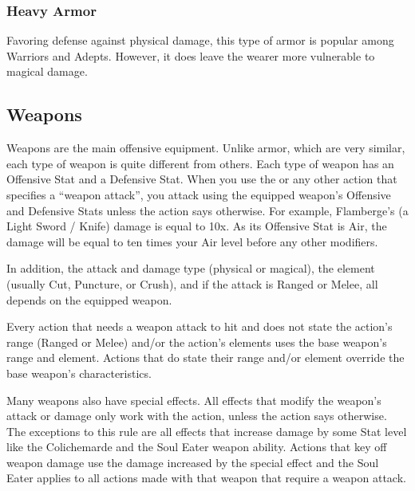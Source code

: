 \clearpage
\subsubsection{Heavy Armor}

Favoring defense against physical damage, this type of armor is popular among Warriors and Adepts.  However, it does leave the wearer more vulnerable to magical damage.

\begin{tabarm}[label=inv-harm]
    
\end{tabarm}
\clearpage

\subsection{Weapons}\label{subsec:inv-weapons}

\begin{multicols}{2}
Weapons are the main offensive equipment.  Unlike armor, which are very similar, each type of weapon is quite different from others.  Each type of weapon has an Offensive Stat and a Defensive Stat.  When you use the  or any other action that specifies a “weapon attack”, you attack using the equipped weapon's Offensive and Defensive Stats unless the action says otherwise.  For example, Flamberge's (a Light Sword / Knife) damage is equal to 10x.  As its Offensive Stat is Air, the damage will be equal to ten times your Air level before any other modifiers.

In addition, the attack and damage type (physical or magical), the element (usually Cut, Puncture, or Crush), and if the attack is Ranged or Melee, all depends on the equipped weapon.

Every action that needs a weapon attack to hit and does not state the action's range (Ranged or Melee) and/or the action's elements uses the base weapon's range and element.  Actions that do state their range and/or element override the base weapon's characteristics.

Many weapons also have special effects.  All effects that modify the weapon's attack or damage only work with the  action, unless the action says otherwise.  The exceptions to this rule are all effects that increase damage by some Stat level like the Colichemarde and the Soul Eater weapon ability.  Actions that key off weapon damage use the damage increased by the special effect and the Soul Eater applies to all actions made with that weapon that require a weapon attack.
\end{multicols}
\begin{center}
\end{center}
\clearpage
